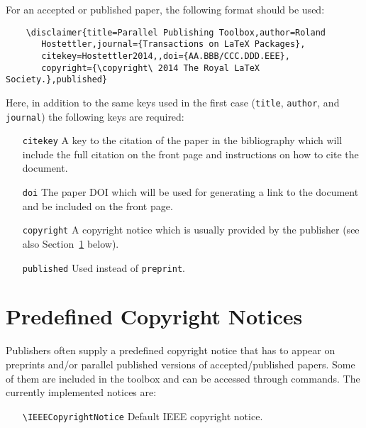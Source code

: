For an accepted or published paper, the following format should be used:
%
\begin{verbatim}
	\disclaimer{title=Parallel Publishing Toolbox,author=Roland
	   Hostettler,journal={Transactions on LaTeX Packages},
	   citekey=Hostettler2014,,doi={AA.BBB/CCC.DDD.EEE},
	   copyright={\copyright\ 2014 The Royal LaTeX Society.},published}
\end{verbatim}

Here, in addition to the same keys used in the first case (\texttt{title}, \texttt{author}, and \texttt{journal}) the following keys are required:
%
\begin{itemize}
	\item[\texttt{citekey}]    A key to the citation of the paper in the bibliography which will include the full citation on the front page and instructions on how to cite the document.

	\item[\texttt{doi}]        The paper DOI which will be used for generating a link to the document and be included on the front page.
	
	\item[\texttt{copyright}]  A copyright notice which is usually provided by the publisher (see also Section~\ref{sec:copyright_notices} below).
	
	\item[\texttt{published}]  Used instead of \texttt{preprint}.
\end{itemize}


\section{Predefined Copyright Notices}
\label{sec:copyright_notices}
Publishers often supply a predefined copyright notice that has to appear on preprints and/or parallel published versions of accepted/published papers. Some of them are included in the toolbox and can be accessed through commands. The currently implemented notices are:
%
\begin{itemize}[leftmargin=4.5cm]
	\item[\texttt{\textbackslash IEEECopyrightNotice}]	Default IEEE copyright notice.
\end{itemize}







